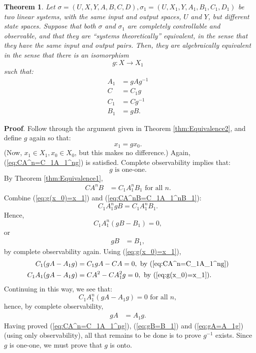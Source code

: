 \documentclass[12pt]{book}
\theoremstyle{plain}
\newtheorem{theorem}{Theorem}[section]
\theoremstyle{definition}
\begin{document}
\begin{theorem} \label{thm:Equivalence3}
    Let $\sigma = (U, X, Y, A, B, C, D), \sigma_1 = (U, X_1, Y, A_1, B_1, C_1, D_1)$ be two linear systems, with the same input and output spaces, $U$ and $Y$, but different state spaces.
    Suppose that both $\sigma$ and $\sigma_1$ are completely controllable and observable, and that they are ``systems theoretically'' equivalent, in the sense that they have the same input and output pairs.
    Then, they are algebraically equivalent in the sense that there is an isomorphism
    $$g: X \to X_1$$
    such that:
    \begin{align}
        A_1 &= gAg^{-1} \\
        C &= C_1g \\
        C_1 &= Cg^{-1} \\
        B_1 &= gB.
    \end{align}
\end{theorem}

\textbf{Proof}.
Follow through the argument given in Theorem \ref{thm:Equivalence2}, and define $g$ again so that:
$$x_1 = gx_0.$$
(Now, $x_1 \in X_1, x_0 \in X_0$, but this makes no difference.)
Again, (\ref{eq:CA^n=C_1A_1^ng}) is satisfied.
Complete observability implies that:
$$g \text{ is one-one}.$$
By Theorem \ref{thm:Equivalence1},
\begin{align} \label{eq:CA^nB=C_1A_1^nB_1}
    CA^nB &= C_1A_1^nB_1 \text{ for all } n.
\end{align}
Combine (\ref{eq:g(x_0)=x_1}) and (\ref{eq:CA^nB=C_1A_1^nB_1}):
$$C_1A_1^ngB = C_1A_1^nB_1.$$
Hence,
$$C_1A_1^n(gB-B_1) = 0,$$
or
\begin{align} \label{eq:gB=B_1}
    gB &= B_1,
\end{align}
by complete observability again.
Using (\ref{eq:g(x_0)=x_1}),
\begin{align*}
\begin{split}
    C_1(gA - A_1g) &= C_1gA - CA = 0, \text{ by } (\ref{eq:CA^n=C_1A_1^ng}) \\
    C_1A_1(gA - A_1g) &= CA^2 - CA_1^2g = 0, \text{ by } (\ref{eq:g(x_0)=x_1}).
\end{split}
\end{align*}
Continuing in this way, we see that:
$$C_1A_1^n(gA - A_1g) = 0 \text{ for all } n,$$
hence, by complete observability,
\begin{align} \label{eq:gA=A_1g}
    gA &= A_1g.
\end{align}
Having proved (\ref{eq:CA^n=C_1A_1^ng}), (\ref{eq:gB=B_1}) and (\ref{eq:gA=A_1g}) (using only observability), all that remains to be done is to prove $g^{-1}$ exists.
Since $g$ is one-one, we must prove that $g$ is onto.
\end{document}
